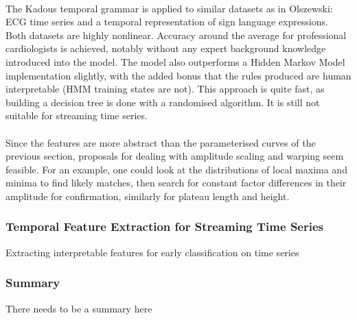 \documentclass[11pt]{article}
\begin{document}
	\paragraph{}
	The Kadous temporal grammar is applied to similar datasets as in Olszewski: ECG time series and a temporal representation of sign language expressions.  Both datasets are highly nonlinear. Accuracy around the average for professional cardiologists is achieved, notably without any expert background knowledge introduced into the model. The model also outperforms a Hidden Markov Model implementation slightly, with the added bonus that the rules produced are human interpretable (HMM training states are not). This approach is quite fast, as building a decision tree is done with a randomised algorithm. It is still not suitable for streaming time series.
	\paragraph{}
	Since the features are more abstract than the parameterised curves of the previous section, proposals for dealing with amplitude scaling and warping seem feasible. For an example, one could look at the distributions of local maxima and minima to find likely matches, then search for constant factor differences in their amplitude for confirmation, similarly for plateau length and height.
	\subsubsection{Temporal Feature Extraction for Streaming Time Series}
		Extracting interpretable features for early classification on time series \citep{xing2011extracting}
	\subsubsection{Summary}
	There needs to be a summary here
	
\end{document}

